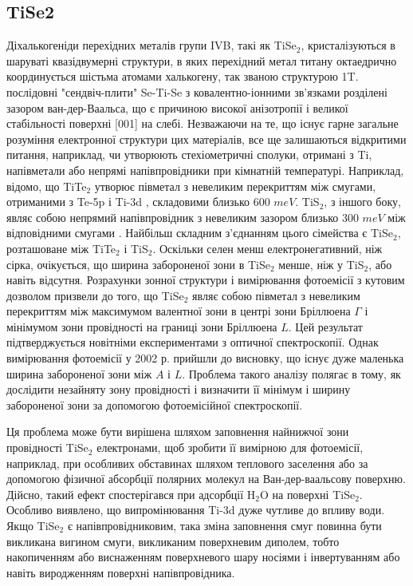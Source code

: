 \subsection{TiSe2}
Діхалькогеніди перехідних металів групи IVB, такі як TiSe$_2$, кристалізуються в шаруваті квазідвумерні структури, в яких перехідний метал титану октаедрично координується шістьма атомами халькогену, так званою структурою 1T. послідовні "сендвіч-плити" Se-Ti-Se з ковалентно-іонними зв'язками розділені зазором ван-дер-Ваальса, що є причиною високої анізотропії і великої стабільності поверхні [001] на слебі. Незважаючи на те, що існує гарне загальне розуміння електронної структури цих матеріалів, все ще залишаються відкритими питання, наприклад, чи утворюють стехіометричні сполуки, отримані з Ti, напівметали або непрямі напівпровідники при кімнатній температурі. Наприклад, відомо, що TiTe$_2$ утворює півметал з невеликим перекриттям між смугами, отриманими з Te-5p і Ti-3d \cite{PhysRevB29, PhysRevB54}, складовими близько 600 $meV$. TiS$_2$, з іншого боку, являє собою непрямий напівпровідник з невеликим зазором близько 300 $meV$ між відповідними смугами \cite{PhysRevB16, PhysRevB21}. Найбільш складним з'єднанням цього сімейства є TiSe$_2$, розташоване між TiTe$_2$ і TiS$_2$. Оскільки селен менш електронегативний, ніж сірка, очікується, що ширина забороненої зони в TiSe$_2$ менше, ніж у TiS$_2$, або навіть відсутня. Розрахунки зонної структури і вимірювання фотоемісії з кутовим дозволом \cite{PhysRevB17,PhysRevL55,SolidStateCommun53,PhysRevB61} призвели до того, що TiSe$_2$ являє собою півметал з невеликим перекриттям між максимумом валентної зони в центрі зони Бріллюена $\Gamma$ і мінімумом зони провідності на границі зони Бріллюена $L$. Цей результат підтверджується новітніми експериментами з оптичної спектроскопії. Однак вимірювання фотоемісії у 2002 р. \cite{PhysRev65,PhyRevLet88} прийшли до висновку, що існує дуже маленька ширина забороненої зони між $A$ і $L$. Проблема такого аналізу полягає в тому, як дослідити незайняту зону провідності і визначити її мінімум і ширину забороненої зони за допомогою фотоемісійної спектроскопії.

Ця проблема може бути вирішена шляхом заповнення найнижчої зони провідності TiSe$_2$ електронами, щоб зробити її вимірною для фотоемісії, наприклад, при особливих обставинах шляхом теплового заселення або за допомогою фізичної абсорбції полярних молекул на Ван-дер-ваальсову поверхню. Дійсно, такий ефект спостерігався при адсорбції H$_2$O на поверхні TiSe$_2$. Особливо виявлено, що випромінювання Ti-3d дуже чутливе до впливу води. Якщо TiSe$_2$ є напівпровідниковим, така зміна заповнення смуг повинна бути викликана вигином смуги, викликаним поверхневим диполем, тобто накопиченням або виснаженням поверхневого шару носіями і інвертуванням або навіть виродженням поверхні напівпровідника.
